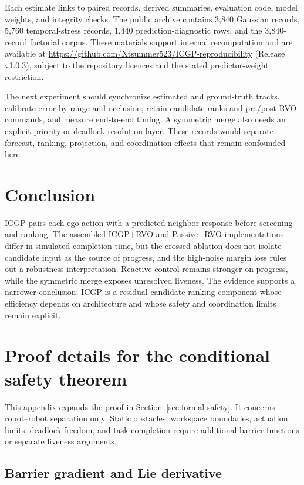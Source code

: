 \documentclass[pdflatex,sn-mathphys-num]{sn-jnl}
\begin{document}
Each estimate links to paired records, derived summaries, evaluation code, model weights, and integrity checks. The public archive contains 3,840 Gaussian records, 5,760 temporal-stress records, 1,440 prediction-diagnostic rows, and the 3,840-record factorial corpus. These materials support internal recomputation and are available at \url{https://github.com/Xtsummer523/ICGP-reproducibility} (Release v1.0.3), subject to the repository licences and the stated predictor-weight restriction.

The next experiment should synchronize estimated and ground-truth tracks, calibrate error by range and occlusion, retain candidate ranks and pre/post-RVO commands, and measure end-to-end timing. A symmetric merge also needs an explicit priority or deadlock-resolution layer. These records would separate forecast, ranking, projection, and coordination effects that remain confounded here.
\section{Conclusion}
\label{sec:conclusion}

ICGP pairs each ego action with a predicted neighbor response before screening and ranking. The assembled ICGP+RVO and Passive+RVO implementations differ in simulated completion time, but the crossed ablation does not isolate candidate input as the source of progress, and the high-noise margin loss rules out a robustness interpretation. Reactive control remains stronger on progress, while the symmetric merge exposes unresolved liveness. The evidence supports a narrower conclusion: ICGP is a residual candidate-ranking component whose efficiency depends on architecture and whose safety and coordination limits remain explicit.
\appendix
\section{Proof details for the conditional safety theorem}
\label{app:cbf-proof}

This appendix expands the proof in Section~\ref{sec:formal-safety}. It concerns robot--robot separation only. Static obstacles, workspace boundaries, actuation limits, deadlock freedom, and task completion require additional barrier functions or separate liveness arguments.

\subsection{Barrier gradient and Lie derivative}
\end{document}
